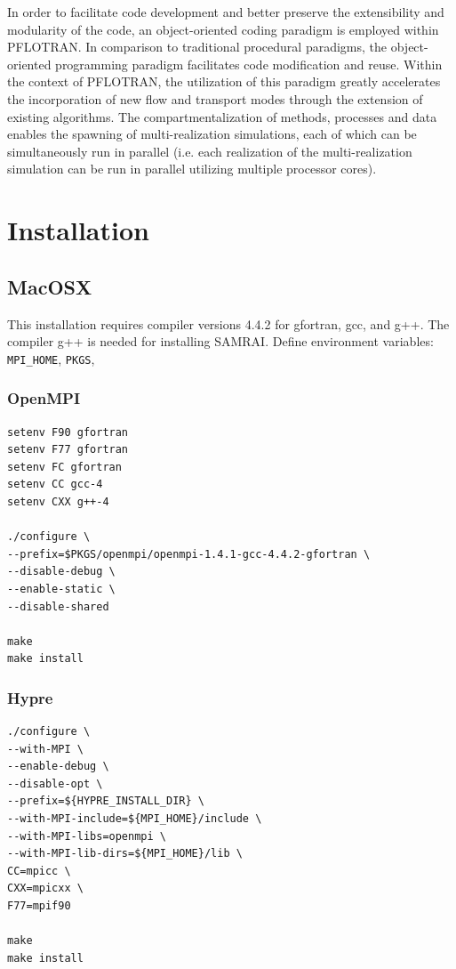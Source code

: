 \documentclass[12pt]{article}
\begin{document}
In order to facilitate code development and better preserve the extensibility and modularity of the code, an object-oriented coding paradigm is employed within PFLOTRAN.  In comparison to traditional procedural paradigms, the object-oriented programming paradigm facilitates code modification and reuse.  Within the context of PFLOTRAN, the utilization of this paradigm greatly accelerates the incorporation of new flow and transport modes through the extension of existing algorithms.  The compartmentalization of methods, processes and data enables the spawning of multi-realization simulations, each of which can be simultaneously run in parallel (i.e. each realization of the multi-realization simulation can be run in parallel utilizing multiple processor cores).

\section{Installation}

\subsection{MacOSX}

This installation requires compiler versions 4.4.2 for gfortran, gcc, and g++. The compiler g++ is needed for installing SAMRAI.
Define environment variables: {\tt MPI\_HOME}, {\tt PKGS}, 

\subsubsection{OpenMPI}

\begin{verbatim}
setenv F90 gfortran
setenv F77 gfortran
setenv FC gfortran
setenv CC gcc-4
setenv CXX g++-4

./configure \
--prefix=$PKGS/openmpi/openmpi-1.4.1-gcc-4.4.2-gfortran \
--disable-debug \
--enable-static \
--disable-shared

make
make install
\end{verbatim}

\subsubsection{Hypre}

\begin{verbatim}
./configure \
--with-MPI \
--enable-debug \
--disable-opt \
--prefix=${HYPRE_INSTALL_DIR} \
--with-MPI-include=${MPI_HOME}/include \
--with-MPI-libs=openmpi \
--with-MPI-lib-dirs=${MPI_HOME}/lib \
CC=mpicc \
CXX=mpicxx \
F77=mpif90

make
make install
\end{verbatim}
\end{document}

